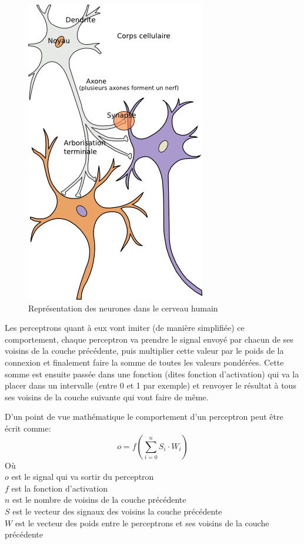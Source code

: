 \documentclass{article}
\begin{document}
\begin{figure}[H]
\begin{center}
	\includegraphics[scale=0.5]{neurones.png}
	\caption{Représentation des neurones dans le cerveau humain \cite{neurons}}
\end{center}
\end{figure}

Les perceptrons quant à eux vont imiter (de manière simplifiée) ce comportement, chaque perceptron va prendre le signal envoyé par chacun de ses voisins de la couche précédente, puis multiplier cette valeur par le poids de la connexion et finalement faire la somme de toutes les valeurs pondérées. Cette somme est ensuite passée dans une fonction (dites fonction d'activation) qui va la placer dans un intervalle (entre 0 et 1 par exemple) et renvoyer le résultat à tous ses voisins de la couche suivante qui vont faire de même\cite{wikiperceptron}.

D'un point de vue mathématique le comportement d'un perceptron peut être écrit comme:
\begin{equation}
o = f(\sum_{i=0}^{n} S_i \cdot W_i)
\label{eq:percep}
\end{equation}
Où\\
$o$ est le signal qui va sortir du perceptron\\
$f$ est la fonction d'activation\\
$n$ est le nombre de voisins de la couche précédente\\
$S$ est le vecteur des signaux des voisins la couche précédente\\
$W$ est le vecteur des poids entre le perceptrons et ses voisins de la couche précédente
\end{document}
